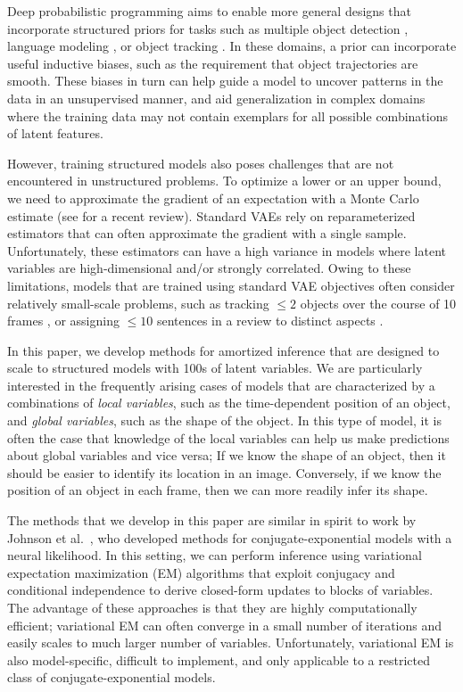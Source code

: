 \documentclass{article}
\theoremstyle{definition}
\begin{document}
Deep probabilistic programming aims to enable more general designs that incorporate structured priors for tasks such as multiple object detection \cite{eslami2016attend}, language modeling \cite{esmaeili2019structured}, or object tracking \cite{kosiorek2018sequential}. In these domains, a prior can incorporate useful inductive biases, such as the requirement that object trajectories are smooth. These biases in turn can help guide a model to uncover patterns in the data in an unsupervised manner, and aid generalization in complex domains where the training data may not contain exemplars for all possible combinations of latent features.

However, training structured models also poses challenges that are not encountered in unstructured problems. To optimize a lower or an upper bound, we need to approximate the gradient of an expectation with a Monte Carlo estimate (see \cite{mohamed2019monte} for a recent review). Standard VAEs rely on reparameterized estimators that can often approximate the gradient with a single sample. Unfortunately, these estimators can have a high variance in models where latent variables are high-dimensional and/or strongly correlated. Owing to these limitations, models that are trained using standard VAE objectives often consider relatively small-scale problems, such as tracking $\le 2$ objects over the course of 10 frames \cite{kosiorek2018sequential}, or assigning $\le 10$ sentences in a review to distinct aspects \cite{esmaeili2019structured}. 

In this paper, we develop methods for amortized inference that are designed to scale to structured models with 100s of latent variables. We are particularly interested in the frequently arising cases of models that  are characterized by a combinations of \emph{local variables}, such as the time-dependent position of an object, and \emph{global variables}, such as the shape of the object. In this type of model, it is often the case that knowledge of the local variables can help us make predictions about global variables and vice versa; If we know the shape of an object, then it should be easier to identify its location in an image. Conversely, if we know the position of an object in each frame, then we can more readily infer its shape.

The methods that we develop in this paper are similar in spirit to work by Johnson et al.~\cite{johnson2016composing}, who developed methods for  conjugate-exponential models with a neural likelihood. In this setting, we can perform inference using variational expectation maximization (EM) algorithms \cite{beal2003variational,bishop2006pattern,wainwright2008graphical} that exploit conjugacy and conditional independence to derive closed-form updates to blocks of variables. The advantage of these approaches is that they are highly computationally efficient; variational EM can often converge in a small number of iterations and easily scales to much larger number of variables. Unfortunately, variational EM is also model-specific, difficult to implement, and only applicable to a restricted class of conjugate-exponential models.
\end{document}
